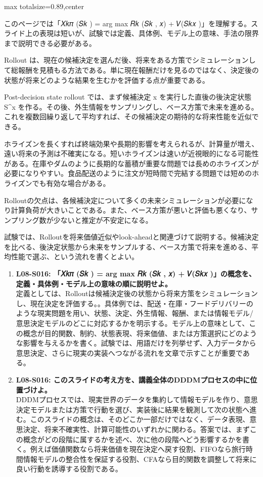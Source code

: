 \begin{minipage}[t]{0.58\textwidth}
\begin{adjustbox}{max totalsize={\textwidth}{0.89\textheight},center}
\begin{minipage}{\textwidth}\scriptsize
{}このページでは「𝑋𝑘𝜋 (𝑆𝑘 ) = arg max 𝑅𝑘 (𝑆𝑘 , 𝑥) + 𝑉(𝑆𝑘𝑥 )」を理解する。スライド上の表現は短いが、試験では定義、具体例、モデル上の意味、手法の限界まで説明できる必要がある。\par
Rollout は、現在の候補決定を選んだ後、将来をある方策でシミュレーションして総報酬を見積もる方法である。単に現在報酬だけを見るのではなく、決定後の状態が将来どのような結果を生むかを評価する点が重要である。\par
Post-decision state rollout では、まず候補決定 x を実行した直後の後決定状態 S\textasciicircum{}x を作る。その後、外生情報をサンプリングし、ベース方策で未来を進める。これを複数回繰り返して平均すれば、その候補決定の期待的な将来性能を近似できる。\par
ホライズンを長くすれば終端効果や長期的影響を考えられるが、計算量が増え、遠い将来の予測は不確実になる。短いホライズンは速いが近視眼的になる可能性がある。在庫やダムのように長期的な蓄積が重要な問題では長めのホライズンが必要になりやすい。食品配送のように注文が短時間で完結する問題では短めのホライズンでも有効な場合がある。\par
Rolloutの欠点は、各候補決定について多くの未来シミュレーションが必要になり計算負荷が大きいことである。また、ベース方策が悪いと評価も悪くなり、サンプリング数が少ないと推定が不安定になる。\par
試験では、Rolloutを将来価値近似やlook-aheadと関連づけて説明する。候補決定を比べる、後決定状態から未来をサンプルする、ベース方策で将来を進める、平均性能で選ぶ、という流れを書くとよい。\par{}\begin{enumerate}\item \textbf{L08-S016: 「𝑋𝑘𝜋 (𝑆𝑘 ) = arg max 𝑅𝑘 (𝑆𝑘 , 𝑥) + 𝑉(𝑆𝑘𝑥 )」の概念を、定義・具体例・モデル上の意味の順に説明せよ。}\\定義としては、Rolloutは候補決定後の状態から将来方策をシミュレーションし、現在決定を評価する。。具体例では、配送・在庫・フードデリバリーのような現実問題を用い、状態、決定、外生情報、報酬、または情報モデル/意思決定モデルのどこに対応するかを明示する。モデル上の意味として、この概念が目的関数、制約、状態表現、将来価値、または方策選択にどのような影響を与えるかを書く。試験では、用語だけを列挙せず、入力データから意思決定、さらに現実の実装へつながる流れを文章で示すことが重要である。\item \textbf{L08-S016: このスライドの考え方を、講義全体のDDDMプロセスの中に位置づけよ。}\\DDDMプロセスでは、現実世界のデータを集約して情報モデルを作り、意思決定モデルまたは方策で行動を選び、実装後に結果を観測して次の状態へ進む。このスライドの概念は、そのどこか一部だけではなく、データ表現、意思決定、将来不確実性、計算可能性のいずれかに関わる。答案では、まずこの概念がどの段階に属するかを述べ、次に他の段階へどう影響するかを書く。例えば価値関数なら将来価値を現在決定へ戻す役割、FIFOなら旅行時間情報モデルの整合性を保証する役割、CFAなら目的関数を調整して将来に良い行動を誘導する役割である。\end{enumerate}

\end{minipage}
\end{adjustbox}
\end{minipage}
